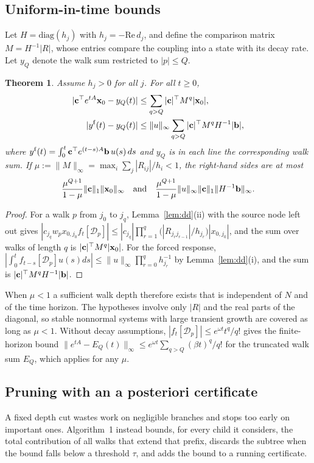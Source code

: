 \documentclass[aps,pra,superscriptaddress,floatfix,longbibliography,twocolumn]{revtex4-2}
\newcommand{\bx}{{\bf x}}
\newcommand{\bb}{{\bf b}}
\newcommand{\bc}{{\bf c}}
\newtheorem{theorem}{Theorem}
\begin{document}
\subsection{Uniform-in-time bounds}
Let $H=\mathrm{diag}(h_j)$ with $h_j=-\mathrm{Re}\,d_j$, and define the comparison matrix $M=H^{-1}|R|$, whose entries compare the coupling into a state with its decay rate. Let $y_Q$ denote the walk sum restricted to $|p|\le Q$.
\begin{theorem}\label{thm:uniform}
Assume $h_j>0$ for all $j$. For all $t\ge0$,
\begin{align}
|\bc^\top e^{tA}\bx_0-y_Q(t)|&\le\sum_{q>Q}|\bc|^\top M^q|\bx_0|,\label{eq:uni_zi}\\
|y^{\rm f}(t)-y_Q(t)|&\le\|u\|_\infty\sum_{q>Q}|\bc|^\top M^qH^{-1}|\bb|,\label{eq:uni_f}
\end{align}
where $y^{\rm f}(t)=\int_0^t\bc^\top e^{(t-s)A}\bb\,u(s)\,ds$ and $y_Q$ is in each line the corresponding walk sum.
If $\mu:=\|M\|_\infty=\max_i\sum_j|R_{ij}|/h_i<1$, the right-hand sides are at most
\begin{equation*}
\frac{\mu^{Q+1}}{1-\mu}\|\bc\|_1\|\bx_0\|_\infty\quad\text{and}\quad\frac{\mu^{Q+1}}{1-\mu}\|u\|_\infty\|\bc\|_1\|H^{-1}\bb\|_\infty .
\end{equation*}
\end{theorem}
\begin{proof}
For a walk $p$ from $j_0$ to $j_q$, Lemma~\ref{lem:dd}(ii) with the source node left out gives $|c_{j_q}w_px_{0,j_0}f_t[\mathcal{D}_p]|\le|c_{j_q}|\prod_{r=1}^{q}\big(|R_{j_rj_{r-1}}|/h_{j_r}\big)|x_{0,j_0}|$, and the sum over walks of length $q$ is $|\bc|^\top M^q|\bx_0|$. For the forced response, $|\int_0^tf_{t-s}[\mathcal{D}_p]u(s)ds|\le\|u\|_\infty\prod_{r=0}^qh_{j_r}^{-1}$ by Lemma~\ref{lem:dd}(i), and the sum is $|\bc|^\top M^qH^{-1}|\bb|$.
\end{proof}
When $\mu<1$ a sufficient walk depth therefore exists that is independent of $N$ and of the time horizon. The hypotheses involve only $|R|$ and the real parts of the diagonal, so stable nonnormal systems with large transient growth are covered as long as $\mu<1$. Without decay assumptions, $|f_t[\mathcal{D}_p]|\le e^{\omega t}t^q/q!$ gives the finite-horizon bound $\|e^{tA}-E_Q(t)\|_\infty\le e^{\omega t}\sum_{q>Q}(\beta t)^q/q!$ for the truncated walk sum $E_Q$, which applies for any $\mu$.

\subsection{Pruning with an a posteriori certificate}\label{sec:certificate}
A fixed depth cut wastes work on negligible branches and stops too early on important ones. Algorithm~1 instead bounds, for every child it considers, the total contribution of all walks that extend that prefix, discards the subtree when the bound falls below a threshold $\tau$, and adds the bound to a running certificate.
\end{document}
